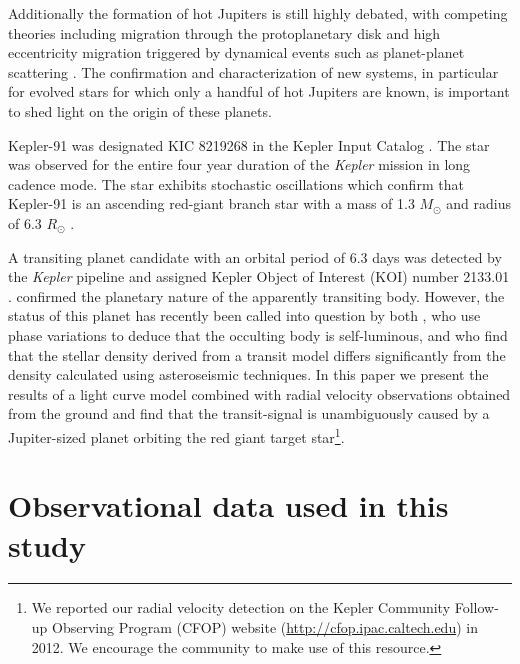 \documentclass[apjl]{emulateapj}
\begin{document}
Additionally the formation of hot Jupiters is still highly debated, with competing theories including migration through the protoplanetary disk \citep{lin96} and high eccentricity migration triggered by dynamical events such as planet-planet scattering \citep{nagasawa08}. The confirmation and characterization of new systems, in particular for evolved stars for which only a handful of hot Jupiters are known, is important to shed light on the origin of these planets.

Kepler-91 was designated KIC 8219268  in the Kepler Input Catalog \citep{brown11}. The star was observed for the entire four year duration of the \emph{Kepler} mission in long cadence mode. The star exhibits stochastic oscillations which confirm that Kepler-91 is an ascending red-giant branch star with a mass of 1.3 $M_\odot$ and radius of 6.3 $R_\odot$ \citep{huber13,lillo14}.



A transiting planet candidate with an orbital period of 6.3 days was detected by the \emph{Kepler} pipeline \citep{jenkins10,tenenbaum13} and assigned Kepler Object of Interest (KOI) number 2133.01 \citep{batalha12}. \citet{lillo14} confirmed the planetary nature of the apparently transiting body. However, the status of this planet has recently been called into question by both \citet{esteves13}, who use phase variations to deduce that the occulting body is self-luminous, and \citet{sliski14} who find that the stellar density derived from a transit model differs significantly from the density calculated using asteroseismic techniques. In this paper we present the results of a light curve model combined with radial velocity observations obtained from the ground and find that the transit-signal is unambiguously caused by a Jupiter-sized planet orbiting the red giant target star\footnote{We reported our radial velocity detection on the Kepler Community Follow-up Observing Program (CFOP) website (\url{http://cfop.ipac.caltech.edu}) in 2012. We encourage the community to make use of this resource.}.


\section{Observational data used in this study}
\end{document}
